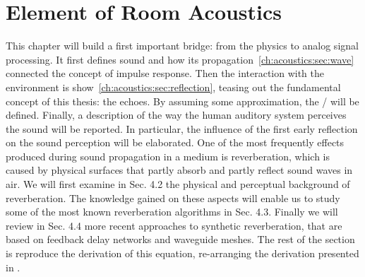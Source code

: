 \chapter{Element of Room Acoustics}\label{chap:acoustics}
\vspace{-2.5em}
This chapter will build a first important bridge: from the physics to analog signal processing.
It first defines sound and how its propagation~\cref{ch:acoustics:sec:wave} connected the concept of impulse response.
Then the interaction with the environment is show~\cref{ch:acoustics:sec:reflection}, teasing out the fundamental concept of this thesis: the echoes.
By assuming some approximation, the \RIRf/ will be defined.
Finally, a description of the way the human auditory system perceives the sound will be reported.
In particular, the influence of the first early reflection on the sound perception will be elaborated.
One of the most frequently effects produced during sound propagation in a medium is reverberation,
which is caused by physical surfaces that partly absorb and partly reflect sound waves in air. We will first examine in Sec. 4.2 the physical and perceptual background of reverberation. The knowledge gained on these aspects will enable us to study some of the most known reverberation algorithms in Sec. 4.3. Finally we will review in Sec. 4.4 more recent approaches to synthetic reverberation, that are based on feedback delay networks and waveguide meshes.
The rest of the section is reproduce the derivation of this equation, re-arranging the derivation presented in \cite{kuttruff2016room, pierce2019acoustics, marczuk2006modelling, avanzini2019sound}.

